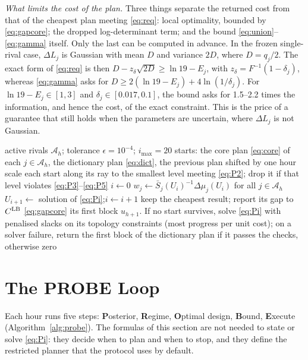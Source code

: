\documentclass[journal,onecolumn,11pt]{IEEEtran}
\begin{document}
\emph{What limits the cost of the plan.} Three things separate the returned cost from that of the cheapest plan meeting \eqref{eq:req}: local optimality, bounded by \eqref{eq:gapcore}; the dropped log-determinant term; and the bound \eqref{eq:union}--\eqref{eq:gamma} itself. Only the last can be computed in advance. In the frozen single-rival case, $\Delta L_j$ is Gaussian with mean $D$ and variance $2D$, where $D=q_j/2$. The exact form of \eqref{eq:req} is then $D-z_\delta\sqrt{2D}\ge\ln19-E_j$, with $z_\delta=F^{-1}(1-\delta_j)$, whereas \eqref{eq:gamma} asks for $D\ge2(\ln19-E_j)+4\ln(1/\delta_j)$. For $\ln19-E_j\in[1,3]$ and $\delta_j\in[0.017,0.1]$, the bound asks for 1.5--2.2 times the information, and hence the cost, of the exact constraint. This is the price of a guarantee that still holds when the parameters are uncertain, where $\Delta L_j$ is not Gaussian.

\begin{algorithm}[t]
\caption{Sequential convex solution of the dispatch program}\label{alg:ccp}
\begin{algorithmic}[1]
\Require active rivals $\mathcal A_h$; tolerance $\epsilon=10^{-4}$; $i_{\max}=20$
\State starts: the core plan \eqref{eq:core} of each $j\in\mathcal A_h$, the dictionary plan \eqref{eq:dict}, the previous plan shifted by one hour
\State scale each start along its ray to the smallest level meeting \eqref{eq:P2}; drop it if that level violates \eqref{eq:P3}--\eqref{eq:P5}
  \State $i\gets0$
  \Repeat
    \State $w_j\gets\bar S_j(U_i)^{-1}\Delta\mu_j(U_i)$ for all $j\in\mathcal A_h$ 
    \State $U_{i+1}\gets$ solution of \eqref{eq:Pi};\quad $i\gets i+1$
\EndFor
\State keep the cheapest result; report its gap to $C^{\rm LB}$ \eqref{eq:gapcore}
\State \Return its first block $u_{h+1}$. If no start survives, solve \eqref{eq:Pi} with penalised slacks on its topology constraints (most progress per unit cost); on a solver failure, return the first block of the dictionary plan if it passes the checks, otherwise zero
\end{algorithmic}
\end{algorithm}

\section{The PROBE Loop}\label{sec:loop}
Each hour runs five steps: \textbf{P}osterior, \textbf{R}egime, \textbf{O}ptimal design, \textbf{B}ound, \textbf{E}xecute (Algorithm~\ref{alg:probe}). The formulas of this section are not needed to state or solve \eqref{eq:Pi}: they decide when to plan and when to stop, and they define the restricted planner that the protocol uses by default.
\end{document}
